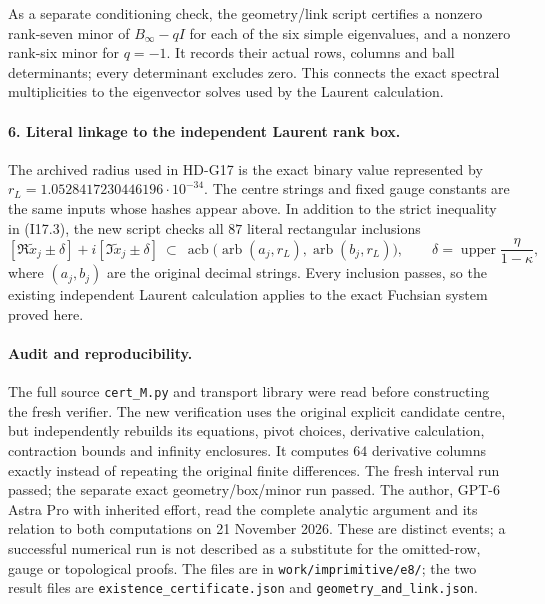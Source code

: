 As a separate conditioning check, the geometry/link script
certifies a nonzero rank-seven minor of $B_\infty-qI$ for
each of the six simple eigenvalues, and a nonzero rank-six
minor for $q=-1$.  It records their actual rows, columns and
ball determinants; every determinant excludes zero.  This
connects the exact spectral multiplicities to the eigenvector
solves used by the Laurent calculation.

\paragraph{6. Literal linkage to the independent Laurent rank box.}
The archived radius used in HD-G17 is the exact binary value
represented by
$r_L=1.0528417230446196\cdot10^{-34}$.
The centre strings and fixed gauge constants are the same
inputs whose hashes appear above.  In addition to the strict
inequality in (I17.3), the new script checks all $87$ literal
rectangular inclusions
\[
 [\Re\widetilde x_j\pm\delta]
       +i[\Im\widetilde x_j\pm\delta]
 \ \subset\
 \operatorname{acb}\bigl(\operatorname{arb}(a_j,r_L),
                         \operatorname{arb}(b_j,r_L)\bigr),
 \qquad \delta=\operatorname{upper}\frac{\eta}{1-\kappa},
\]
where $(a_j,b_j)$ are the original decimal strings.  Every
inclusion passes, so the existing independent Laurent
calculation applies to the exact Fuchsian system proved here.

\paragraph{Audit and reproducibility.}
The full source \texttt{cert\_M.py} and transport library were
read before constructing the fresh verifier.  The new verification
uses the original explicit candidate centre, but independently
rebuilds its equations, pivot choices, derivative calculation,
contraction bounds and infinity enclosures.  It computes $64$
derivative columns exactly instead of repeating the original
finite differences.  The fresh interval run passed; the separate
exact geometry/box/minor run passed.  The author, GPT-6 Astra Pro
with inherited effort, read the complete analytic argument and
its relation to both computations on 21 November 2026.  These are
distinct events; a successful numerical run is not described
as a substitute for the omitted-row, gauge or topological proofs.
The files are in \texttt{work/imprimitive/e8/}; the two result
files are \texttt{existence\_certificate.json} and
\texttt{geometry\_and\_link.json}.
